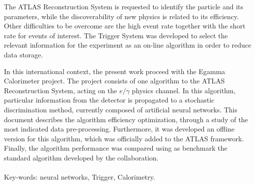 The ATLAS Reconstruction System is requested to identify the particle and its
parameters, while the discoverability of new physics is related to its
efficiency. Other difficulties to be overcome are the high event rate together
with the short rate for events of interest. The Trigger System was developed to
select the relevant information for the experiment as an on-line algorithm in
order to reduce data storage.

In this international context, the present work proceed with the Egamma
Calorimeter project. The project consists of one algorithm to the 
ATLAS Reconstruction System, 
acting on the $e/\gamma$ physics channel. In this algorithm,
particular information from the detector is propagated to a stochastic
discrimination method, currently composed of artificial neural networks.
This document describes the algorithm efficiency optimization, through a study
of the most indicated data pre-processing. Furthermore, it was developed an
offline version for this algorithm, which was officially added to the ATLAS framework. 
Finally, the algorithm performance was compared using as benchmark the
standard algorithm developed by the collaboration.

\paragraph*{}

\noindent Key-words: neural networks, Trigger, Calorimetry.

\vfill
\clearpage

